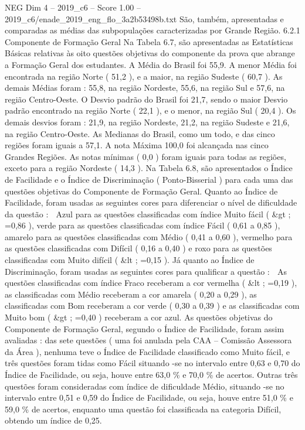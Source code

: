 \begin{textsample}{NEG Dim 4 – 2019\_c6 – Score 1.00 – 2019\_c6/enade\_2019\_eng\_flo\_3a2b53498b.txt}
São, também, apresentadas e comparadas as médias das subpopulações caracterizadas por Grande Região. 6.2.1 Componente de Formação Geral Na Tabela 6.7, são apresentadas as Estatísticas Básicas relativas às oito questões objetivas do componente da prova que abrange a Formação Geral dos estudantes.
A Média do Brasil foi 55,9.
A menor Média foi encontrada na região Norte ( 51,2 ), e a maior, na região Sudeste ( 60,7 ).
As demais Médias foram : 55,8, na região Nordeste, 55,6, na região Sul e 57,6, na região Centro-Oeste.
O Desvio padrão do Brasil foi 21,7, sendo o maior Desvio padrão encontrado na região Norte ( 22,1 ), e o menor, na região Sul ( 20,4 ).
Os demais desvios foram : 21,9, na região Nordeste, 21,2, na região Sudeste e 21,6, na região Centro-Oeste.
As Medianas do Brasil, como um todo, e das cinco regiões foram iguais a 57,1.
A nota Máxima 100,0 foi alcançada nas cinco Grandes Regiões.
As notas mínimas ( 0,0 ) foram iguais para todas as regiões, exceto para a região Nordeste ( 14,3 ).
Na Tabela 6.8, são apresentados o Índice de Facilidade e o Índice de Discriminação ( Ponto-Bisserial ) para cada uma das questões objetivas do Componente de Formação Geral.
Quanto ao Índice de Facilidade, foram usadas as seguintes cores para diferenciar o nível de dificuldade da questão :  Azul para as questões classificadas com índice Muito fácil ( \&gt ; =0,86 ), verde para as questões classificadas com índice Fácil ( 0,61 a 0,85 ), amarelo para as questões classificadas com Médio ( 0,41 a 0,60 ), vermelho para as questões classificadas com Difícil ( 0,16 a 0,40 ) e roxo para as questões classificadas com Muito difícil ( \&lt ; =0,15 ).
Já quanto ao Índice de Discriminação, foram usadas as seguintes cores para qualificar a questão :  As questões classificadas com índice Fraco receberam a cor vermelha ( \&lt ; =0,19 ), as classificadas com Médio receberam a cor amarela ( 0,20 a 0,29 ), as classificadas com Bom receberam a cor verde ( 0,30 a 0,39 ) e as classificadas com Muito bom ( \&gt ; =0,40 ) receberam a cor azul.
As questões objetivas do Componente de Formação Geral, segundo o Índice de Facilidade, foram assim avaliadas : das sete questões ( uma foi anulada pela CAA – Comissão Assessora da Área ), nenhuma teve o Índice de Facilidade classificado como Muito fácil, e três questões foram tidas como Fácil situando -se no intervalo entre 0,63 e 0,70 do Índice de Facilidade, ou seja, houve entre 63,0 \% e 70,0 \% de acertos.
Outras três questões foram consideradas com índice de dificuldade Médio, situando -se no intervalo entre 0,51 e 0,59 do Índice de Facilidade, ou seja, houve entre 51,0 \% e 59,0 \% de acertos, enquanto uma questão foi classificada na categoria Difícil, obtendo um índice de 0,25.

\end{textsample}
